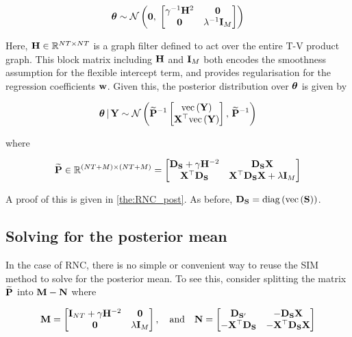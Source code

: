 \begin{equation}
    \label{eq:theta_prior}
    \boldsymbol{\theta} \sim \mathcal{N}\left( \mathbf{0}, \; \begin{bmatrix} \gamma^{-1} \mathbf{H}^2 & \mathbf{0} \\ \mathbf{0} & \lambda^{-1} \mathbf{I}_M \end{bmatrix} \right)
\end{equation}

Here, $\mathbf{H} \in \mathbb{R}^{NT \times NT}$ is a graph filter defined to act over the entire T-V product graph. This block matrix including $\mathbf{H}$ and $\mathbf{I}_M$ both encodes the smoothness assumption for the flexible intercept term, and provides regularisation for the regression coefficients $\mathbf{w}$. Given this, the posterior distribution over $\boldsymbol{\theta}$ is given by 

\begin{equation}
    \boldsymbol{\theta} \, | \, \mathbf{Y} \sim \mathcal{N}\left(\widetilde{\mathbf{P}}^{-1} \begin{bmatrix} \text{\textup{vec}}\left(\mathbf{Y}\right) \\ \mathbf{X}^\top \text{\textup{vec}}\left(\mathbf{Y}\right) \end{bmatrix}, \, \widetilde{\mathbf{P}}^{-1}\right)
\end{equation}

where 

\begin{equation}
    \widetilde{\mathbf{P}} \in \mathbb{R}^{(NT + M) \times (NT + M)}= 
    \begin{bmatrix}
     \mathbf{D}_{\mathbf{S}} + \gamma \mathbf{H}^{-2} & \mathbf{D}_{\mathbf{S}}  \mathbf{X} \\
     \mathbf{X}^\top \mathbf{D}_{\mathbf{S}} & \mathbf{X}^\top \mathbf{D}_{\mathbf{S}} \mathbf{X} + \lambda \mathbf{I}_M   
    \end{bmatrix}
\end{equation}


A proof of this is given in \cref{the:RNC_post}. As before, $\mathbf{D}_{\mathbf{S}} = \text{\textup{diag}}\left(\text{\textup{vec}}\left(\mathbf{S}\right)\right)$. 
    
\subsection{Solving for the posterior mean}

\label{sec:RNC_solving}

In the case of RNC, there is no simple or convenient way to reuse the SIM method to solve for the posterior mean. To see this, consider splitting the matrix $\widetilde{\mathbf{P}}$ into $\mathbf{M} - \mathbf{N}$ where 

\begin{equation*}
    \mathbf{M} = 
    \begin{bmatrix}
        \mathbf{I}_{NT} + \gamma \mathbf{H}^{-2} & \mathbf{0} \\
        \mathbf{0} & \lambda \mathbf{I}_M   
       \end{bmatrix}, 
       \quad \text{and} \quad \mathbf{N} = \begin{bmatrix}
        \mathbf{D}_{\mathbf{S}'} & -\mathbf{D}_{\mathbf{S}}  \mathbf{X} \\
        -\mathbf{X}^\top \mathbf{D}_{\mathbf{S}} & -\mathbf{X}^\top\mathbf{D}_{\mathbf{S}} \mathbf{X} 
       \end{bmatrix}
\end{equation*}

